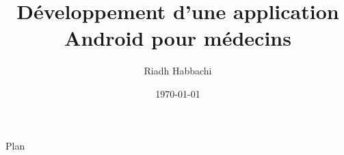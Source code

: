 \documentclass[
ucs
, xcolor=table
]{beamer}
\title[Projet de fin d'etudes]
{Développement d'une application Android pour médecins}
\author{Riadh Habbachi}
\institute[ENIG]{Ecole Nationale d'Ingénieurs de Gabes}
\date[]{\today}
\begin{document}
\begin{frame}
	\titlepage
\end{frame}

\begin{frame}{Plan}
	\tableofcontents
\end{frame}




\end{document}
